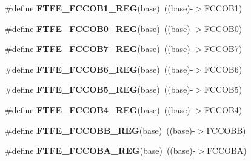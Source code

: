 \begin{DoxyCompactItemize}
\item 
\#define {\bfseries F\+T\+F\+E\+\_\+\+F\+C\+C\+O\+B1\+\_\+\+R\+EG}(base)~((base)-\/$>$F\+C\+C\+O\+B1)\hypertarget{group__FTFE__Register__Accessor__Macros_gaf76b6dd1ac06faa3e5bb9610805ff77a}{}\label{group__FTFE__Register__Accessor__Macros_gaf76b6dd1ac06faa3e5bb9610805ff77a}

\item 
\#define {\bfseries F\+T\+F\+E\+\_\+\+F\+C\+C\+O\+B0\+\_\+\+R\+EG}(base)~((base)-\/$>$F\+C\+C\+O\+B0)\hypertarget{group__FTFE__Register__Accessor__Macros_ga9ba789e7566270e86861a325bb994115}{}\label{group__FTFE__Register__Accessor__Macros_ga9ba789e7566270e86861a325bb994115}

\item 
\#define {\bfseries F\+T\+F\+E\+\_\+\+F\+C\+C\+O\+B7\+\_\+\+R\+EG}(base)~((base)-\/$>$F\+C\+C\+O\+B7)\hypertarget{group__FTFE__Register__Accessor__Macros_gabce22e13e4df05708ac71f8be18247c9}{}\label{group__FTFE__Register__Accessor__Macros_gabce22e13e4df05708ac71f8be18247c9}

\item 
\#define {\bfseries F\+T\+F\+E\+\_\+\+F\+C\+C\+O\+B6\+\_\+\+R\+EG}(base)~((base)-\/$>$F\+C\+C\+O\+B6)\hypertarget{group__FTFE__Register__Accessor__Macros_ga316ad370f1cf470a68e87f10d7b36ab1}{}\label{group__FTFE__Register__Accessor__Macros_ga316ad370f1cf470a68e87f10d7b36ab1}

\item 
\#define {\bfseries F\+T\+F\+E\+\_\+\+F\+C\+C\+O\+B5\+\_\+\+R\+EG}(base)~((base)-\/$>$F\+C\+C\+O\+B5)\hypertarget{group__FTFE__Register__Accessor__Macros_ga5b354a0660870449f2b7afa8b13e43a8}{}\label{group__FTFE__Register__Accessor__Macros_ga5b354a0660870449f2b7afa8b13e43a8}

\item 
\#define {\bfseries F\+T\+F\+E\+\_\+\+F\+C\+C\+O\+B4\+\_\+\+R\+EG}(base)~((base)-\/$>$F\+C\+C\+O\+B4)\hypertarget{group__FTFE__Register__Accessor__Macros_ga211ffcfaf46f1ba8d5b32fbd4d1dca28}{}\label{group__FTFE__Register__Accessor__Macros_ga211ffcfaf46f1ba8d5b32fbd4d1dca28}

\item 
\#define {\bfseries F\+T\+F\+E\+\_\+\+F\+C\+C\+O\+B\+B\+\_\+\+R\+EG}(base)~((base)-\/$>$F\+C\+C\+O\+BB)\hypertarget{group__FTFE__Register__Accessor__Macros_ga8d9fa6e59edfcbbb72b4cf4c500495f3}{}\label{group__FTFE__Register__Accessor__Macros_ga8d9fa6e59edfcbbb72b4cf4c500495f3}

\item 
\#define {\bfseries F\+T\+F\+E\+\_\+\+F\+C\+C\+O\+B\+A\+\_\+\+R\+EG}(base)~((base)-\/$>$F\+C\+C\+O\+BA)\hypertarget{group__FTFE__Register__Accessor__Macros_ga2c1fdb064c3b83a80706bcabb81c88cf}{}\label{group__FTFE__Register__Accessor__Macros_ga2c1fdb064c3b83a80706bcabb81c88cf}


\end{DoxyCompactItemize}
